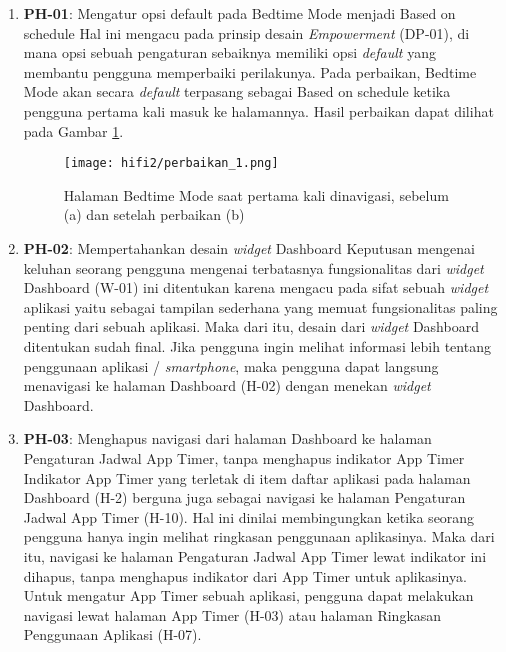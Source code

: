 \begin{enumerate}
  \item \textbf{PH-01}: Mengatur opsi default pada Bedtime Mode menjadi Based on schedule
  \subitem Hal ini mengacu pada prinsip desain \textit{Empowerment} (DP-01), di mana opsi sebuah pengaturan sebaiknya memiliki opsi \textit{default} yang membantu pengguna memperbaiki perilakunya. Pada perbaikan, Bedtime Mode akan secara \textit{default} terpasang sebagai Based on schedule ketika pengguna pertama kali masuk ke halamannya. Hasil perbaikan dapat dilihat pada Gambar \ref{img:perbaikan_1}.
  
  \begin{figure}[h]
    \centering
    \texttt{[image: hifi2/perbaikan\_1.png]}
    \caption{Halaman Bedtime Mode saat pertama kali dinavigasi, sebelum (a) dan setelah perbaikan (b)}
    \label{img:perbaikan_1}
  \end{figure}
  \FloatBarrier

  
  \item \textbf{PH-02}: Mempertahankan desain \textit{widget} Dashboard
  \subitem Keputusan mengenai keluhan seorang pengguna mengenai terbatasnya fungsionalitas dari \textit{widget} Dashboard (W-01) ini ditentukan karena mengacu pada sifat sebuah \textit{widget} aplikasi yaitu sebagai tampilan sederhana yang memuat fungsionalitas paling penting dari sebuah aplikasi. Maka dari itu, desain dari \textit{widget} Dashboard ditentukan sudah final. Jika pengguna ingin melihat informasi lebih tentang penggunaan aplikasi / \textit{smartphone}, maka pengguna dapat langsung menavigasi ke halaman Dashboard (H-02) dengan menekan \textit{widget} Dashboard.  

  \item \textbf{PH-03}: Menghapus navigasi dari halaman Dashboard ke halaman Pengaturan Jadwal App Timer, tanpa menghapus indikator App Timer
  \subitem Indikator App Timer yang terletak di item daftar aplikasi pada halaman Dashboard (H-2) berguna juga sebagai navigasi ke halaman Pengaturan Jadwal App Timer (H-10). Hal ini dinilai membingungkan ketika seorang pengguna hanya ingin melihat ringkasan penggunaan aplikasinya. Maka dari itu, navigasi ke halaman Pengaturan Jadwal App Timer lewat indikator ini dihapus, tanpa menghapus indikator dari App Timer untuk aplikasinya. Untuk mengatur App Timer sebuah aplikasi, pengguna dapat melakukan navigasi lewat halaman App Timer (H-03) atau halaman Ringkasan Penggunaan Aplikasi (H-07).


\end{enumerate}
